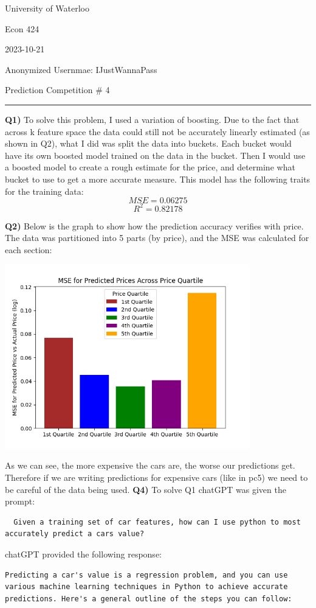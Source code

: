 \documentclass{article}
\begin{document}
\begin{titlepage}
	\setlength{\parindent}{0pt}
	\large

\vspace*{-2cm}

University of Waterloo \par
Econ 424 \par
2023-10-21 \par
\vspace{0.05cm}
Anonymized Usernmae: IJustWannaPass
\vspace{0.2cm}

{\huge Prediction Competition \# 4 \par}
\hrule

\vspace{1cm}
\textbf{Q1)} To solve this problem, I used a variation of boosting. Due to the fact that across k feature space the data could still not be accurately linearly estimated (as shown in Q2), what I did was split the data into buckets. Each bucket would have its own boosted model trained on the data in the bucket. Then I would use a boosted model to create a rough estimate for the price, and determine what bucket to use to get a more accurate measure. This model has the following traits for the training data:
\[ MSE = 0.06275 \]
\[ R^2 = 0.82178 \]

\textbf{Q2)} Below is the graph to show how the prediction accuracy verifies with price. The data was partitioned into 5 parts (by price), and the MSE was calculated for each section:
\begin{center}
\includegraphics[width=0.8\textwidth]{g1.png}
\end{center}
As we can see, the more expensive the cars are, the worse our predictions get. Therefore if we are writing predictions for expensive cars (like in pc5) we need to be careful of the data being used.
\newpage
\textbf{Q4)} To solve Q1 chatGPT was given the prompt: 
\begin{verbatim}
  Given a training set of car features, how can I use python to most accurately predict a cars value?
\end{verbatim}
chatGPT provided the following response:
\begin{verbatim}
Predicting a car's value is a regression problem, and you can use various machine learning techniques in Python to achieve accurate predictions. Here's a general outline of the steps you can follow:


\end{verbatim}
\end{titlepage}
\end{document}
